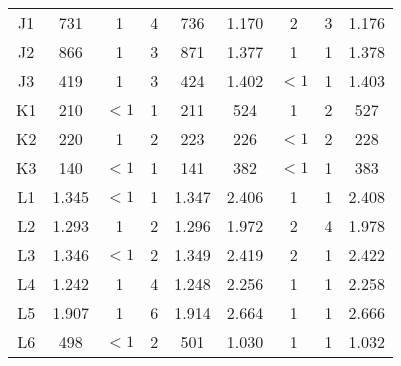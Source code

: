 \begin{center}
\begin{longtable}{ccccc|cccc}
    J1    & 731   & 1     & 4     & 736   & 1.170 & 2     & 3     & 1.176 \\
    J2    & 866   & 1     & 3     & 871   & 1.377 & 1     & 1     & 1.378 \\
    J3    & 419   & 1     & 3     & 424   & 1.402 & $<1$     & 1     & 1.403 \\
    K1    & 210   & $<1$     & 1     & 211   & 524   & 1     & 2     & 527 \\
    K2    & 220   & 1     & 2     & 223   & 226   & $<1$     & 2     & 228 \\
    K3    & 140   & $<1$     & 1     & 141   & 382   & $<1$     & 1     & 383 \\
    L1    & 1.345 & $<1$     & 1     & 1.347 & 2.406 & 1     & 1     & 2.408 \\
    L2    & 1.293 & 1     & 2     & 1.296 & 1.972 & 2     & 4     & 1.978 \\
    L3    & 1.346 & $<1$     & 2     & 1.349 & 2.419 & 2     & 1     & 2.422 \\
    L4    & 1.242 & 1     & 4     & 1.248 & 2.256 & 1     & 1     & 2.258 \\
    L5    & 1.907 & 1     & 6     & 1.914 & 2.664 & 1     & 1     & 2.666 \\
    L6    & 498   & $<1$     & 2     & 501   & 1.030 & 1     & 1     & 1.032 \\

\end{longtable}
\end{center}

